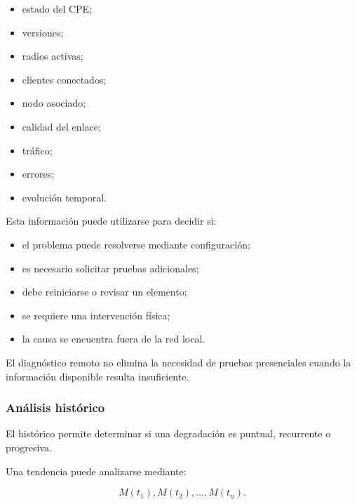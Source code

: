 \begin{itemize}
    \item estado del CPE;

    \item versiones;

    \item radios activas;

    \item clientes conectados;

    \item nodo asociado;

    \item calidad del enlace;

    \item tráfico;

    \item errores;

    \item evolución temporal.
\end{itemize}

Esta información puede utilizarse para decidir si:

\begin{itemize}
    \item el problema puede resolverse mediante configuración;

    \item es necesario solicitar pruebas adicionales;

    \item debe reiniciarse o revisar un elemento;

    \item se requiere una intervención física;

    \item la causa se encuentra fuera de la red local.
\end{itemize}

El diagnóstico remoto no elimina la necesidad de pruebas presenciales
cuando la información disponible resulta insuficiente.


\subsubsection*{Análisis histórico}

El histórico permite determinar si una degradación es puntual,
recurrente o progresiva.

Una tendencia puede analizarse mediante:

\[
    M(t_1),
    M(t_2),
    \ldots,
    M(t_n).
\]


